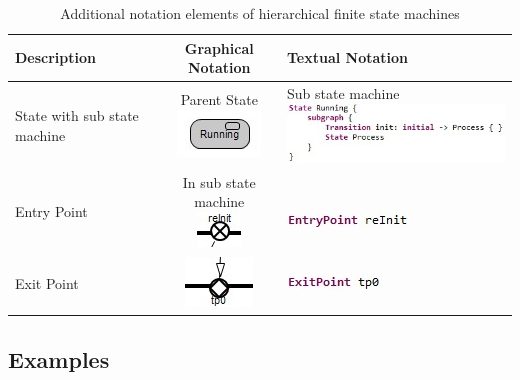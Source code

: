 \begin{table}
\caption{Additional notation elements of hierarchical finite state machines}
\label{tab:hier_fsm_notation}
\begin{tabular}{|b{3cm}|c|l|}
\hline
 \textbf{Description} & \textbf{Graphical Notation} & \textbf{Textual Notation} \\
\hline
 State with sub state machine & \specialcell{Parent State \\ 
\includegraphics[scale=0.7]{images/040-StateWithSubFSM.jpg}} & \specialcell{Sub state machine \\ 
\includegraphics[scale=0.7]{images/040-StateWithSubFSMTextual.jpg}} \\
\hline
 Entry Point & \specialcell{In sub state machine \\ 
\includegraphics[scale=0.7]{images/040-EntryPoint.jpg}} & \specialcell{ \\ 
\includegraphics[scale=0.7]{images/040-EntryPointTextual.jpg}}
\\ \hline
 Exit Point & \includegraphics[scale=0.7]{images/040-ExitPoint.jpg} &
 \includegraphics[scale=0.7]{images/040-ExitPointTextual.jpg} \\ \hline
\end{tabular}
\end{table}

\subsection{Examples}

